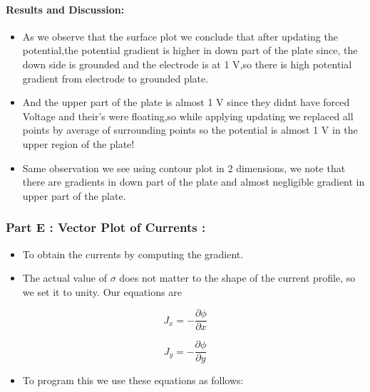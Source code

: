 \documentclass[11pt, a4paper, twoside]{article}
\begin{document}
\paragraph{Results and Discussion:}\label{results-and-discussion5}

\begin{itemize}
\item
  As we observe that the surface plot we conclude that after updating
  the potential,the potential gradient is higher in down part of the
  plate since, the down side is grounded and the electrode is at 1 V,so
  there is high potential gradient from electrode to grounded plate.
\item
  And the upper part of the plate is almost 1 V since they didnt have
  forced Voltage and their's were floating,so while applying updating we
  replaced all points by average of surrounding points so the potential
  is almost 1 V in the upper region of the plate!
\item
  Same observation we see using contour plot in 2 dimensions, we note
  that there are gradients in down part of the plate and almost
  negligible gradient in upper part of the plate.
\end{itemize}

\subsubsection{Part E : Vector Plot of Currents
:}\label{part-e-vector-plot-of-currents}

\begin{itemize}
\item
  To obtain the currents by computing the gradient.
\item
  The actual value of \(\sigma\) does not matter to the shape of the
  current profile, so we set it to unity. Our equations are
\end{itemize}

\begin{equation}
    J_x = -\frac{\partial \phi}{\partial x} 
  \end{equation}

\begin{equation}
    J_y = -\frac{\partial \phi}{\partial y} 
  \end{equation}

\begin{itemize}
\item
  To program this we use these equations as follows:
\end{itemize}
\end{document}
